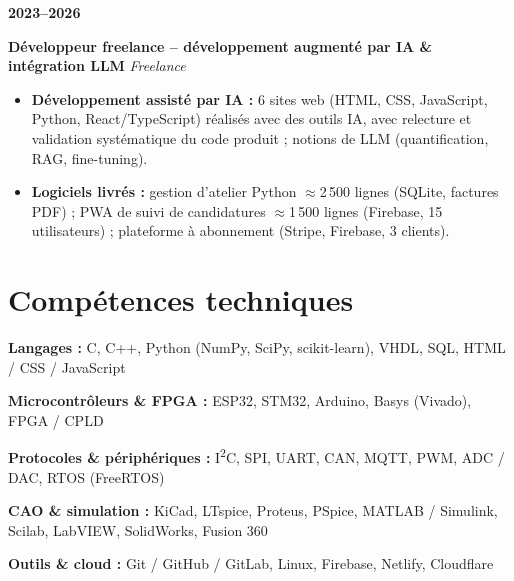 \documentclass[10pt,a4paper]{article}
\newlength{\datewidth}
\newlength{\projectgap}
\newcommand{\experience}[4]{%
    \noindent
    \begin{minipage}[t]{\datewidth}
        \raggedright
        \textbf{#1}
    \end{minipage}%
    \hspace{\projectgap}%
    \begin{minipage}[t]{\dimexpr\linewidth-\datewidth-\projectgap\relax}
        \noindent
        \textbf{#2}%
        \hfill
        \textit{#3}\\[-10pt]
        #4
    \end{minipage}
    \vspace{0pt}
}
\begin{document}
\vspace{6pt}
\experience
{2023--2026}
{Développeur freelance -- développement augmenté par IA \& intégration LLM}
{Freelance}
{%
\begin{itemize}
    \item \textbf{Développement assisté par IA :} 6 sites web (HTML, CSS, JavaScript, Python, React/TypeScript) réalisés avec des outils IA, avec relecture et validation systématique du code produit ; notions de LLM (quantification, RAG, fine-tuning).
    \item \textbf{Logiciels livrés :} gestion d'atelier Python $\approx$2\,500 lignes (SQLite, factures PDF) ; PWA de suivi de candidatures $\approx$1\,500 lignes (Firebase, 15 utilisateurs) ; plateforme à abonnement (Stripe, Firebase, 3 clients).
\end{itemize}
}
\endgroup


\section{Compétences techniques}
\vspace{3pt}\small

\textbf{Langages :}
C, C++, Python (NumPy, SciPy, scikit-learn), VHDL, SQL, HTML / CSS / JavaScript

\vspace{4pt}

\textbf{Microcontrôleurs \& FPGA :}
ESP32, STM32, Arduino, Basys (Vivado), FPGA / CPLD

\vspace{4pt}

\textbf{Protocoles \& périphériques :}
I\textsuperscript{2}C, SPI, UART, CAN, MQTT, PWM, ADC / DAC, RTOS (FreeRTOS)

\vspace{4pt}

\textbf{CAO \& simulation :}
KiCad, LTspice, Proteus, PSpice, MATLAB / Simulink, Scilab, LabVIEW, SolidWorks, Fusion 360

\vspace{4pt}

\textbf{Outils \& cloud :}
Git / GitHub / GitLab, Linux, Firebase, Netlify, Cloudflare
\end{document}
